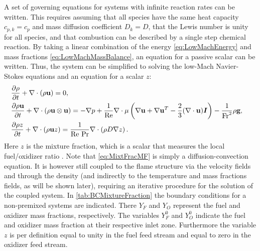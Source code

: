 A set of governing equations for systems with infinite reaction rates can be written. This requires assuming that all species have the same heat capacity $c_{p,k} = c_p$ and mass diffusion coefficient $D_k=D$, that the Lewis number is unity for all species, and that combustion can be described by a single step chemical reaction. By taking a linear combination of the energy \cref{eq:LowMachEnergy} and mass fractions \cref{eq:LowMachMassBalance}, an equation for a passive scalar can be written. Thus, the system can be simplified to solving the low-Mach Navier-Stokes equations and an equation for a scalar $z$:
\begin{subequations}
	\begin{flalign}
		&\frac{\partial \rho}{\partial t}+	\nabla \cdot (\rho \textbf{u})                           = 0,& \label{eq:MixtFracConti2}                                                                                                                                                                    \\	
		&\frac{\partial \rho \textbf{u}}{\partial t} +	\nabla \cdot (\rho \textbf{u} \otimes \textbf{u})  = - \nabla p + \frac{1}{\text{Re}}\nabla \cdot \mu\left( \nabla \textbf{u} +\nabla \textbf{u}^T  - \frac{2}{3}(\nabla\cdot \textbf{u})\boldsymbol I \right)  - \frac{1}{\text{Fr}^2}\rho\textbf{g},&\label{eq:MixtFracMom} \\
		&\frac{\partial \rho z}{\partial t}+	\nabla \cdot (\rho \textbf{u}z)                        = \frac{1}{\text{Re Pr}}\nabla \cdot\left(\rho D \nabla z\right).& \label{eq:MixtFracMF}
	\end{flalign}
	\label{eq:all-eq-mixfrac}
\end{subequations}
Here $z$ is the mixture fraction, which is a scalar that measures the local fuel/oxidizer ratio  \parencite{poinsotTheoreticalNumericalCombustion2011}. Note that \cref{eq:MixtFracMF} is simply a diffusion-convection equation. It is however still coupled to the flame structure via the velocity fields and through the density (and indirectly to the temperature and mass fractions fields, as will be shown later), requiring an iterative procedure for the solution of the coupled system.  In \cref{tab:BCMixtureFraction} the boundary conditions for a non-premixed systems are indicated. There $Y_F$ and $Y_O$ represent the fuel and oxidizer mass fractions, respectively. The variables $Y_F^0$ and $Y_O^0$ indicate the fuel and oxidizer mass fraction at their respective inlet zone. Furthermore the variable $z$ is per definition equal to unity in the fuel feed stream and equal to zero in the oxidizer feed stream.

